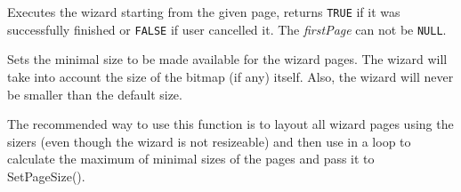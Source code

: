 
Executes the wizard starting from the given page, returns {\tt TRUE} if it was
successfully finished or {\tt FALSE} if user cancelled it. The {\it firstPage} 
can not be {\tt NULL}.

\label{wxwizardsetpagesize}


Sets the minimal size to be made available for the wizard pages. The wizard
will take into account the size of the bitmap (if any) itself. Also, the
wizard will never be smaller than the default size.

The recommended way to use this function is to layout all wizard pages using
the sizers (even though the wizard is not resizeable) and then use 
 in a loop to calculate the maximum
of minimal sizes of the pages and pass it to SetPageSize().

